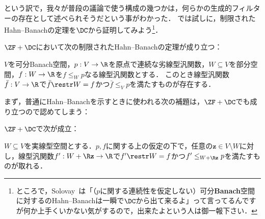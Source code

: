 \documentclass[a4j,leqno]{ltjsarticle}
\renewcommand{\emph}[1]{\textbf{\textsf{#1}}}
\begin{document}
という訳で，我々が普段の議論で使う構成の幾つかは，何らかの生成的フィルターの存在として述べられそうだという事がわかった．
では試しに，制限されたHahn--Banachの定理を$\DC$から証明してみよう\footnote{ところで，Solovay~\cite{Solovay:1970}は「（$p$に関する連続性を仮定しない）可分\emph{Banach}空間に対するのHahn--Banachは一瞬で$\DC$から出て来るよ」って言ってるんですが何か上手くいかない気がするので，出来たよという人は御一報下さい．}．
\begin{theorem}
 $\ZF+\DC$において次の制限されたHahn--Banachの定理が成り立つ：

 $V$を可分Banach空間，$p: V \to \R$を原点で連続な劣線型汎関数，$W \subseteq V$を部分空間，$f: W \to \R$を$f \leq_W p$なる線型汎関数とする．
 このとき線型汎関数$\bar{f}: V \to \R$で$\bar{f} \restr W = f$かつ$\bar{f} \leq_V p$を満たすものが存在する．
\end{theorem}
まず，普通にHahn--Banachを示すときに使われる次の補題は，$\ZF+\DC$でも成り立つので認めてしまう：
\begin{lemma}
 $\ZF+\DC$で次が成立：

 $W \subseteq V$を実線型空間とする．$p, f$に関する上の仮定の下で，任意の$\mathbf{z} \in V \setminus W$に対し，線型汎関数$f' : W + \R\mathbf{z} \to \R$で$f' \restr W = f$かつ$f' \leq_{W + \R\mathbf{z}} p$を満たすものが取れる．
\end{lemma}
\end{document}
